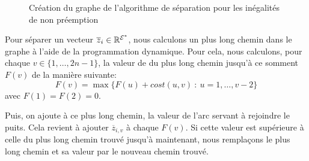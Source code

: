 \begin{ex}
\begin{figure}[!htb]
  \caption{Création du graphe de l'algorithme de séparation pour les
      inégalités de non préemption}
    \label{fig:algo_sep}
  \end{figure}
\end{ex}

Pour séparer un vecteur $\overline{z}_i \in \mathbb{R}^{{\cal E}^*}$, nous
calculons un plus long chemin dans le graphe à l'aide de la
programmation dynamique. Pour cela, nous calculons, pour chaque $v \in
\{1,\dots,2n-1\}$, la valeur de du plus long chemin jusqu'à ce somment
$F(v)$ de la manière suivante:
\begin{equation}
  F(v) = \max\{ F(u) + cost (u,v) \ : \ u=1,\dots,v-2 \}
\end{equation}
avec $F(1)=F(2)=0$. 

Puis, on ajoute à ce plus long chemin, la valeur de l'arc servant à
rejoindre le puits. Cela revient à ajouter $\overline{z}_{i,v}$ à
chaque $F(v)$. Si cette valeur est supérieure à celle du
plus long chemin trouvé jusqu'à maintenant, nous remplaçons le plus
long chemin et sa valeur par le nouveau chemin trouvé.

